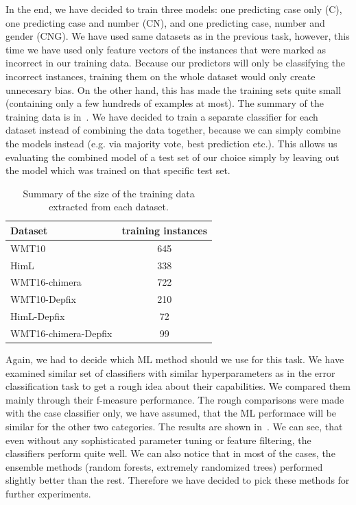 In the end, we have decided to train three models: one predicting case only (C), one predicting case and number (CN),
and one predicting case, number and gender (CNG). We have used same datasets as in the previous task, however, this
time we have used only feature vectors of the instances that were marked as incorrect in our training data. Because
our predictors will only be classifying the incorrect instances, training them on the whole dataset would only create
unnecesary bias. On the other hand, this has made the training sets quite small (containing only a few hundreds of examples
at most). The summary of the training data is in~. We have decided to train a separate classifier
for each dataset instead of combining the data together, because we can simply combine the models instead (e.g. via majority
vote, best prediction etc.). This allows us evaluating the combined model of a test set of our choice simply by leaving
out the model which was trained on that specific test set.

\begin{table}[t]
\centering
\small

\begin{tabular}{lc}
Dataset  &  \hash{} training instances  \\
\hline
WMT10  &  645  \\
HimL  & 338  \\
WMT16-chimera  &  722  \\
WMT10-Depfix  &  210  \\
HimL-Depfix  &  72  \\
WMT16-chimera-Depfix  &  99  \\
\end{tabular}
\caption{
    Summary of the size of the training data extracted from each dataset.
}
\label{cats-training-sum}
\end{table}

Again, we had to decide which ML method should we use for this task. 
We have examined similar set of classifiers with similar
hyperparameters as in the error classification task to get a rough idea about their capabilities. We compared them mainly
through their f-measure performance.
The rough comparisons were made with the case classifier only,
we have assumed, that the ML performace will be similar for the other two categories.
The results are shown in~. We can see, that even without any sophisticated parameter
tuning or feature filtering, the classifiers perform quite well. We can also notice that in most of the cases, the ensemble
methods (random forests, extremely randomized trees) performed slightly better than the rest. Therefore we have decided
to pick these methods for further experiments.

